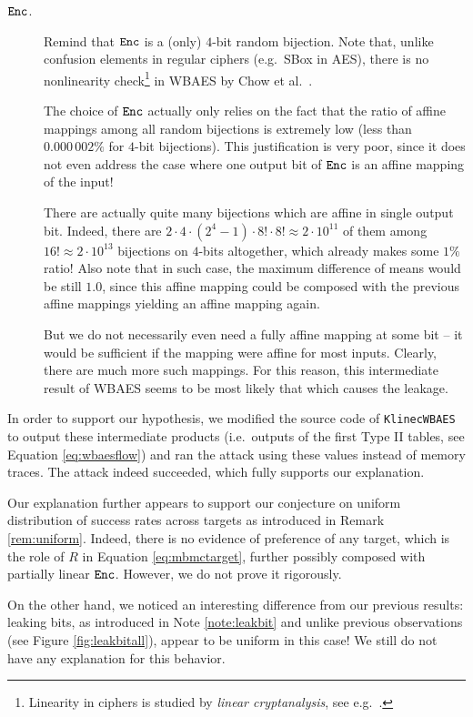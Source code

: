 \begin{description}
	\item[$\texttt{Enc}$.] Remind that $\texttt{Enc}$ is a (only) $4$-bit random bijection. Note that, unlike confusion elements in regular ciphers (e.g.\ SBox in AES), there is no nonlinearity check\footnote{Linearity in ciphers is studied by {\em linear cryptanalysis}, see e.g.\ \cite{matsui1993linear}.} in WBAES by Chow et al.\ \cite{chow2002aes}.
	
	The choice of $\texttt{Enc}$ actually only relies on the fact that the ratio of affine mappings among all random bijections is extremely low (less than $0.000\,002\%$ for $4$-bit bijections). This justification is very poor, since it does not even address the case where one output bit of $\texttt{Enc}$ is an affine mapping of the input!
	
	There are actually quite many bijections which are affine in single output bit. Indeed, there are $2\cdot4\cdot(2^4-1)\cdot8!\cdot8! \approx 2\cdot10^{11}$ of them among $16! \approx 2\cdot10^{13}$ bijections on $4$-bits altogether, which already makes some $1\%$ ratio! Also note that in such case, the maximum difference of means would be still $1.0$, since this affine mapping could be composed with the previous affine mappings yielding an affine mapping again.
	
	But we do not necessarily even need a fully affine mapping at some bit -- it would be sufficient if the mapping were affine for most inputs. Clearly, there are much more such mappings. For this reason, this intermediate result of WBAES seems to be most likely that which causes the leakage.
\end{description}

In order to support our hypothesis, we modified the source code of {\tt KlinecWBAES} to output these intermediate products (i.e.\ outputs of the first Type II tables, see Equation \ref{eq:wbaesflow}) and ran the attack using these values instead of memory traces. The attack indeed succeeded, which fully supports our explanation.

\begin{note}
	Our explanation further appears to support our conjecture on uniform distribution of success rates across targets as introduced in Remark \ref{rem:uniform}. Indeed, there is no evidence of preference of any target, which is the role of $R$ in Equation \ref{eq:mbmctarget}, further possibly composed with partially linear $\texttt{Enc}$. However, we do not prove it rigorously.
	
	On the other hand, we noticed an interesting difference from our previous results: leaking bits, as introduced in Note \ref{note:leakbit} and unlike previous observations (see Figure \ref{fig:leakbitall}), appear to be uniform in this case! We still do not have any explanation for this behavior.
\end{note}

